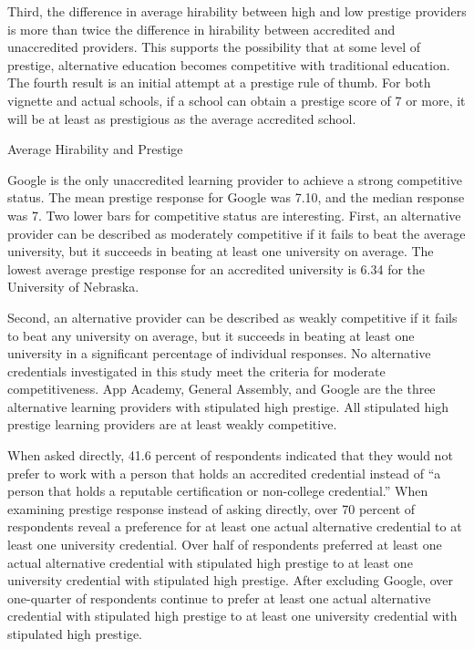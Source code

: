 \documentclass[review]{elsarticle}
\begin{document}
Third, the difference in average hirability between high and low prestige providers
is more than twice the difference in hirability between accredited and unaccredited providers.
This supports the possibility that at some level of prestige,
alternative education becomes competitive with traditional education.
The fourth result is an initial attempt at a prestige rule of thumb.
For both vignette and actual schools,
if a school can obtain a prestige score of 7 or more,
it will be at least as prestigious as the average accredited school.

\begin{table}
    \caption{Average Hirability and Prestige}
    \resizebox{\columnwidth}{!}{
        
    }
    \label{tab:desc_stats}
\end{table}


Google is the only unaccredited learning provider to achieve a strong competitive status.
The mean prestige response for Google was 7.10, and the median response was 7.
Two lower bars for competitive status are interesting.
First, an alternative provider can be described as moderately competitive if it fails to beat the average university,
but it succeeds in beating at least one university on average.
The lowest average prestige response for an accredited university is 6.34 for the University of Nebraska.

Second, an alternative provider can be described as weakly competitive if it fails to beat any university on average,
but it succeeds in beating at least one university in a significant percentage of individual responses.
No alternative credentials investigated in this study meet the criteria for moderate competitiveness.
App Academy, General Assembly, and Google are the three alternative learning providers with stipulated high prestige.
All stipulated high prestige learning providers are at least weakly competitive.

When asked directly, 41.6 percent of respondents indicated that they would not prefer to
work with a person that holds an accredited credential instead of ``a person that holds a reputable certification or non-college credential.''
When examining prestige response instead of asking directly, over 70 percent of respondents reveal a preference for
at least one actual alternative credential to at least one university credential.
Over half of respondents preferred at least one actual alternative credential with stipulated high prestige
to at least one university credential with stipulated high prestige.
After excluding Google, over one-quarter of respondents continue to prefer
at least one actual alternative credential with stipulated high prestige to at least one university credential with stipulated high prestige.
\end{document}
